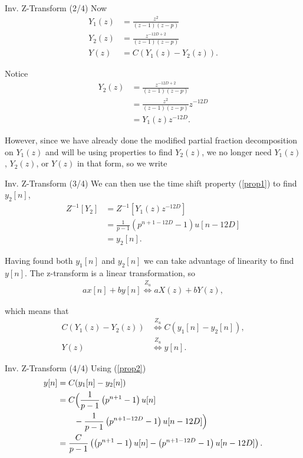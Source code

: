 \documentclass[
    orient=landscape,
    style=sailor
]{powerdot}
\begin{document}
	
\begin{slide}{Inv. Z-Transform (2/4)}
	Now
	\begin{align}
	Y_1(z) &= \frac{z^2}{(z-1)(z - p)} \\
	Y_2(z) &= \frac{z^{-12D+2}}{(z-1)(z - p)} \\
	Y(z)   &= C \left(Y_1(z) - Y_2(z) \right).
	\end{align}
	
	Notice 
	\begin{align}
	Y_2(z) &= \frac{z^{-12D+2}}{(z-1)(z - p)} \\
	&= \frac{z^{2}}{(z-1)(z - p)}z^{-12D} \\
	&= Y_1(z) z^{-12D}.
	\end{align}
\end{slide}

\begin{note}
	However, since we have already done the modified partial fraction decomposition on $Y_1(z)$ and will be using properties to find $Y_2(z)$, we no longer need $Y_1(z)$, $Y_2(z)$, or $Y(z)$ in that form, so we write
\end{note}

\begin{slide}{Inv. Z-Transform (3/4)}
	We can then use the time shift property (\ref{prop1}) to find $y_2[n]$,
	\begin{align}
	Z^{-1}\left[Y_2\right] &= Z^{-1}\left[Y_1(z) z^{-12D}\right] \\
	&= \frac{1}{p - 1}\left(p^{n+1-12D} - 1 \right)u[n-12D] \\
	&= y_2[n].
	\end{align}
	
	Having found both $y_1[n]$ and $y_2[n]$ we can take advantage of linearity to find $y[n]$. The z-transform is a linear transformation, so 
	\begin{align}
	ax[n] + by[n] \stackrel{Z_u}{\Longleftrightarrow} aX(z) + bY(z), \label{prop2}
	\end{align}
	
	which means that 
	\begin{align}
	C \left(Y_1(z) - Y_2(z) \right) &\stackrel{Z_u}{\Longleftrightarrow} C \left(y_1[n] - y_2[n] \right), \\
	Y(z) &\stackrel{Z_u}{\Longleftrightarrow} y[n].
	\end{align}
\end{slide}
	
\begin{slide}{Inv. Z-Transform (4/4)}
	Using (\ref{prop2})
	\begin{align}
	y[n] &= C(y_1[n] - y_2[n]) \\
	&= C \Bigl(\frac{1}{p - 1}\left(p^{n+1} - 1 \right)u[n] \\
	&\qquad- \frac{1}{p - 1}\left(p^{n+1-12D} - 1 \right)u[n-12D] \Bigr) \\
	&= \frac{C}{p - 1}\left(\left(p^{n+1} - 1 \right)u[n] - \left(p^{n+1-12D} - 1 \right)u[n-12D] \right). \label{eqny}
	\end{align}
\end{slide}
\end{document}
